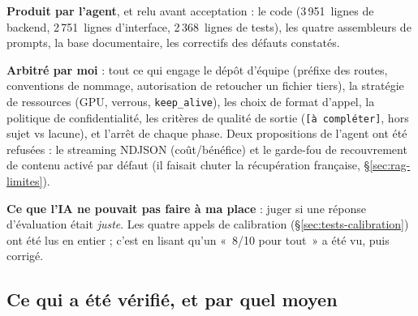 \textbf{Produit par l'agent}, et relu avant acceptation : le code
(3\,951~lignes de backend, 2\,751~lignes d'interface, 2\,368~lignes de tests),
les quatre assembleurs de prompts, la base documentaire, les correctifs des
défauts constatés.

\textbf{Arbitré par moi} : tout ce qui engage le dépôt d'équipe (préfixe des
routes, conventions de nommage, autorisation de retoucher un fichier tiers), la
stratégie de ressources (GPU, verrous, \texttt{keep\_alive}), les choix de
format d'appel, la politique de confidentialité, les critères de qualité de
sortie (\texttt{[à compléter]}, hors sujet vs lacune), et l'arrêt de chaque
phase. Deux propositions de l'agent ont été refusées : le streaming NDJSON
(coût/bénéfice) et le garde-fou de recouvrement de contenu activé par défaut
(il faisait chuter la récupération française, §\ref{sec:rag-limites}).

\textbf{Ce que l'IA ne pouvait pas faire à ma place} : juger si une réponse
d'évaluation était \emph{juste}. Les quatre appels de calibration
(§\ref{sec:tests-calibration}) ont été lus en entier ; c'est en lisant qu'un
«~8/10 pour tout~» a été vu, puis corrigé.

\subsection{Ce qui a été vérifié, et par quel moyen}


